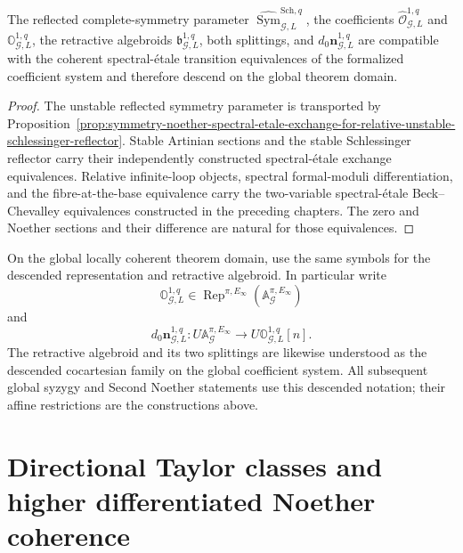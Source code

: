 \begin{proposition}
\label{prop:symmetry-noether-spectral-etale-descent}
The reflected complete-symmetry parameter
$\widehat{\operatorname{Sym}}_{\mathcal G,L}^{\mathrm{Sch},q}$, the coefficients
$\widehat{\mathcal O}_{\mathcal G,L}^{1,q}$ and
$\mathbb O_{\mathcal G,L}^{1,q}$, the retractive algebroids
$\mathfrak b_{\mathcal G,L}^{1,q}$, both splittings, and
$d_0\mathbf n_{\mathcal G,L}^{1,q}$ are compatible with the coherent
spectral-\'etale transition equivalences of the formalized coefficient system and
therefore descend on the global theorem domain.
\end{proposition}

\begin{proof}
The unstable reflected symmetry parameter is transported by
Proposition~\ref{prop:symmetry-noether-spectral-etale-exchange-for-relative-unstable-schlessinger-reflector}.
Stable Artinian sections and the stable Schlessinger reflector carry their
independently constructed spectral-\'etale exchange equivalences.  Relative
infinite-loop objects, spectral formal-moduli differentiation, and the
fibre-at-the-base equivalence carry the two-variable spectral-\'etale
Beck--Chevalley equivalences constructed in the preceding chapters.  The zero and
Noether sections and their difference are natural for those equivalences.
\end{proof}

\begin{convention}
\label{conv:symmetry-noether-global-descended-notation}
On the global locally coherent theorem domain, use the same symbols for the
descended representation and retractive algebroid.  In particular write
\[
\mathbb O_{\mathcal G,L}^{1,q}
\in
\operatorname{Rep}^{\pi,E_\infty}
\left(
\mathbb A_{\mathcal G}^{\pi,E_\infty}
\right)
\]
and
\[
\boxed{
d_0\mathbf n_{\mathcal G,L}^{1,q}:
U\mathbb A_{\mathcal G}^{\pi,E_\infty}
\longrightarrow
U\mathbb O_{\mathcal G,L}^{1,q}[n].
}
\]
The retractive algebroid and its two splittings are likewise understood as the
descended cocartesian family on the global coefficient system.  All subsequent
global syzygy and Second Noether statements use this descended notation; their
affine restrictions are the constructions above.
\end{convention}

\section{Directional Taylor classes and higher differentiated Noether coherence}
\label{sec:symmetry-noether-directional-taylor-classes-and-higher-differentiated-noether-coherence}

